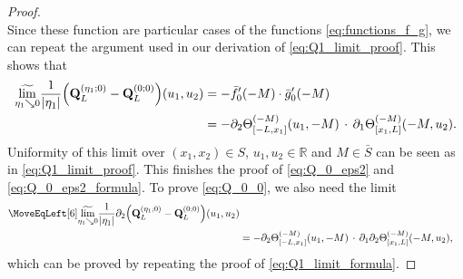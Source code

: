 \documentclass[oneside,final,11pt]{amsart}
\theoremstyle{definition}
\newcommand{\mylim}[1]{\underset{#1}{\wt{\mathrm{lim}}}}
\newcommand{\R}{\mathbb{R}}
\newcommand{\1}[1]{\mathbf{1}_{#1}}
\newcommand{\wt}{\widetilde}
\newcommand{\fx}{x}
\newcommand{\fM}{M}
\newcommand{\fQ}{\mathbf{Q}}
\numberwithin{equation}{section}
\begin{document}
\begin{proof}
\begin{equation}
\end{equation}
Since these function are particular cases of the functions \eqref{eq:functions_f_g}, we can repeat the argument used in our derivation of \eqref{eq:Q1_limit_proof}. This shows that
\begin{align}
	\mylim{\eta_1 \searrow 0} \frac{1}{|\eta_1|} \Bigl(\fQ_L^{(\eta_1; 0)} - \fQ_L^{(0; 0)}\Bigr)(u_1, u_2) &= - \bar{f}'_0(-M) \cdot \bar{g}'_{0}(-M)\\
	&= -\partial_{2} \Theta^{(-\fM)}_{[-L, \fx_1]} (u_1, -\fM) \,\cdot\, \partial_{1} \Theta^{(-\fM)}_{[\fx_1, L]} (-\fM, u_2).\label{eq:Q1_limit_formula}
\end{align}
Uniformity of this limit over $(x_1, x_2) \in S$, $u_1, u_2 \in \R$ and $M \in \bar S$ can be seen as in \eqref{eq:Q1_limit_proof}. This finishes the proof of \eqref{eq:Q_0_eps2} and \eqref{eq:Q_0_eps2_formula}. To prove \eqref{eq:Q_0_0}, we also need the limit
\begin{equation}
\begin{split}
\MoveEqLeft[6]
	\mylim{\eta_1 \searrow 0} \frac{1}{|\eta_1|} \partial_2 \Bigl(\fQ_L^{(\eta_1; 0)} - \fQ_L^{(0; 0)}\Bigr)(u_1, u_2)\\
	&= -\partial_{2} \Theta^{(-\fM)}_{[-L, \fx_1]} (u_1, -\fM) \,\cdot\, \partial_{1} \partial_{2} \Theta^{(-\fM)}_{[\fx_1, L]} (-\fM, u_2),
\end{split}
\label{eq:Q1_limit_formula_derivative}
\end{equation}
which can be proved by repeating the proof of \eqref{eq:Q1_limit_formula}.
\smallskip


\end{proof}
\end{document}
